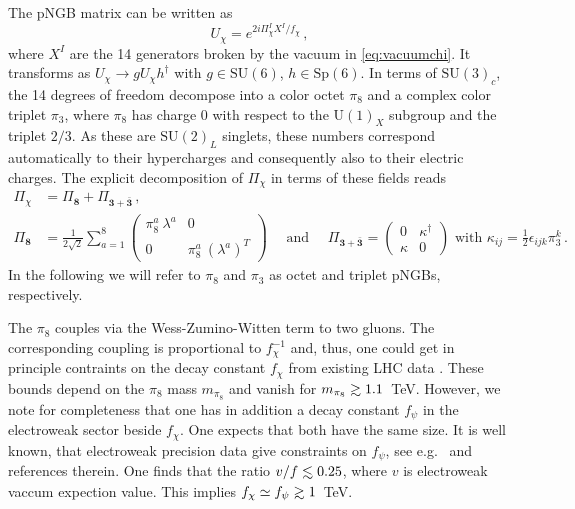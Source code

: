 \documentclass[preprintnumbers,nofootinbib,showpacs,eqsecnum,pre,12pt]{revtex4-1}
\newcommand{\SU}{\text{SU}}
\newcommand{\U}{\text{U}}
\newcommand{\Sp}{\text{Sp}}
\def\gsim{\raise0.3ex\hbox{$\;>$\kern-0.75em\raise-1.1ex\hbox{$\sim\;$}}}
\def\lsim{\raise0.3ex\hbox{$\;<$\kern-0.75em\raise-1.1ex\hbox{$\sim\;$}}}
\begin{document}
The pNGB matrix can be written as
\begin{equation}
U_\chi = e^{2i\Pi^I_\chi X^I/f_\chi}\,,
\end{equation}
where $X^I$ are the 14 generators broken by the vacuum in \cref{eq:vacuumchi}.
It transforms as $U_\chi \rightarrow g U_\chi h^\dagger$ with $g\in \SU(6)$, $h\in \Sp(6)$.
In terms of $\SU(3)_c$, the 14 degrees of freedom decompose into a color octet $\pi_8$ and a complex color triplet $\pi_3$, where
$\pi_8$ has charge 0 with respect to the $\U(1)_X$ subgroup and the triplet $2/3$. As these
are $\SU(2)_L$ singlets, these numbers correspond automatically to their hypercharges
and consequently also to their electric charges. The explicit decomposition of $\Pi_\chi$ 
in terms of these fields reads 
\begin{align}
\label{eq:pi_chi_expl}
\Pi_\chi &= \Pi_\mathbf{8} + \Pi_{\mathbf{3}+\bar{\mathbf{3}}}\,, \\
\Pi_\mathbf{8} &=
\frac{1}{2 \sqrt{2}} \sum_{a=1}^8 \begin{pmatrix} \pi_8^a\ \lambda^a & 0 \\ 0 & \pi_8^a\ (\lambda^a)^T \end{pmatrix} \quad \text{ and } \quad
\Pi_{\mathbf{3}+\bar{\mathbf{3}}} =  \begin{pmatrix} 0 & \kappa^\dagger \\ \kappa & 0\end{pmatrix}
\text{ with } \kappa_{ij} = \frac 12 \epsilon_{ijk} \pi_3^k\,.
\end{align}
In the following we will refer to $\pi_8$ and $\pi_3$ as octet and triplet pNGBs, respectively.
 
The $\pi_8$ couples via
 the Wess-Zumino-Witten term to two gluons. The corresponding coupling is proportional to $f^{-1}_\chi$ and, thus,
 one could get in principle  contraints
 on the decay constant $f_\chi$ from existing LHC data \cite{Cacciapaglia:2020vyf}. These bounds depend on the $\pi_8$ mass $m_{\pi_8}$ and vanish for  $m_{\pi_8}\gsim 1.1$~TeV.
 However, we
note for completeness that one has in addition a decay constant  $f_\psi$ in the electroweak sector beside $f_\chi$. One expects that both have the same size. It is well known, that
 electroweak precision data give constraints on $f_\psi$, see e.g.~\cite{Cacciapaglia:2020kgq} and references therein. One finds that
 the ratio $v/f \lsim 0.25$, where $v$ is electroweak vaccum expection value. This implies  $f_\chi \simeq f_\psi \gsim 1$~TeV. 
\end{document}
